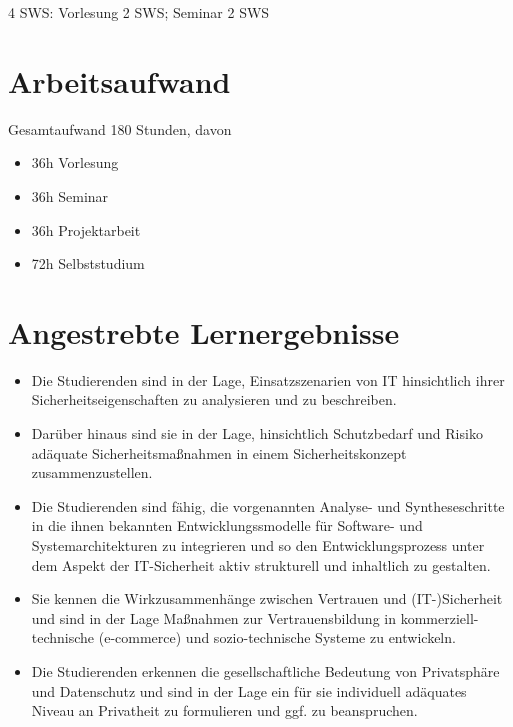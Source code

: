 4 SWS: Vorlesung 2 SWS; Seminar 2 SWS

\section*{Arbeitsaufwand\label{/mi-2017/modulbeschreibungen-master/MA_WTW_Modul_IT-Sicherheit}}\label{arbeitsaufwandpathlabelmi-2017modulbeschreibungen-mastermaux5fwtwux5fmodulux5fit-sicherheit}

Gesamtaufwand 180 Stunden, davon

\begin{itemize}
\tightlist
\item
  36h Vorlesung
\item
  36h Seminar
\item
  36h Projektarbeit
\item
  72h Selbststudium
\end{itemize}

\section*{Angestrebte
Lernergebnisse\label{/mi-2017/modulbeschreibungen-master/MA_WTW_Modul_IT-Sicherheit}}\label{angestrebte-lernergebnissepathlabelmi-2017modulbeschreibungen-mastermaux5fwtwux5fmodulux5fit-sicherheit}

\begin{itemize}
\tightlist
\item
  Die Studierenden sind in der Lage, Einsatzszenarien von IT
  hinsichtlich ihrer Sicherheitseigenschaften zu analysieren und zu
  beschreiben.
\item
  Darüber hinaus sind sie in der Lage, hinsichtlich Schutzbedarf und
  Risiko adäquate Sicherheitsmaßnahmen in einem Sicherheitskonzept
  zusammenzustellen.
\item
  Die Studierenden sind fähig, die vorgenannten Analyse- und
  Syntheseschritte in die ihnen bekannten Entwicklungssmodelle für
  Software- und Systemarchitekturen zu integrieren und so den
  Entwicklungsprozess unter dem Aspekt der IT-Sicherheit aktiv
  strukturell und inhaltlich zu gestalten.
\item
  Sie kennen die Wirkzusammenhänge zwischen Vertrauen und
  (IT-)Sicherheit und sind in der Lage Maßnahmen zur Vertrauensbildung
  in kommerziell-technische (e-commerce) und sozio-technische Systeme zu
  entwickeln.
\item
  Die Studierenden erkennen die gesellschaftliche Bedeutung von
  Privatsphäre und Datenschutz und sind in der Lage ein für sie
  individuell adäquates Niveau an Privatheit zu formulieren und ggf. zu
  beanspruchen.
\end{itemize}


